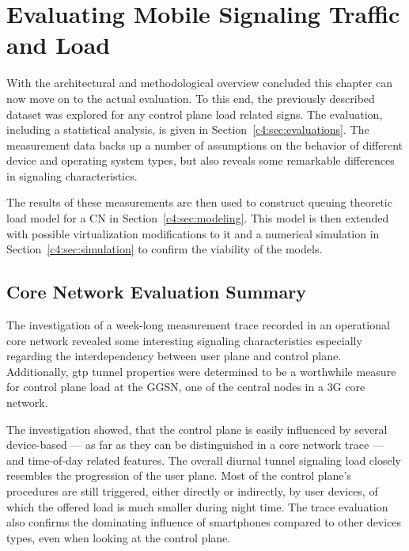 \chapter{Evaluating Mobile Signaling Traffic and Load}
\label{chap:mobilenetsmeasuring}

With the architectural and methodological overview concluded this chapter can now move on to the actual evaluation. To this end, the previously described dataset was explored for any control plane load related signs. The evaluation, including a statistical analysis, is given in Section~\ref{c4:sec:evaluations}. The measurement data backs up a number of assumptions on the behavior of different device and operating system types, but also reveals some remarkable differences in signaling characteristics.

The results of these measurements are then used to construct queuing theoretic load model for a \gls{CN} in Section~\ref{c4:sec:modeling}. This model is then extended with possible virtualization modifications to it and a numerical simulation in Section~\ref{c4:sec:simulation} to confirm the viability of the models.











\section{Core Network Evaluation Summary}
\label{c4:sec:conclusion}


The investigation of a week-long measurement trace recorded in an operational core network revealed some interesting signaling characteristics especially regarding the interdependency between user plane and control plane. Additionally, \gls{gtp} tunnel properties were determined to be a worthwhile measure for control plane load at the \gls{GGSN}, one of the central nodes in a \gls{3G} core network.

The investigation showed, that the control plane is easily influenced by several device-based --- as far as they can be distinguished in a core network trace --- and time-of-day related features. The overall diurnal tunnel signaling load closely resembles the progression of the user plane. Most of the control plane's procedures are still triggered, either directly or indirectly, by user devices, of which the offered load is much smaller during night time. The trace evaluation also confirms the dominating influence of smartphones compared to other devices types, even when looking at the control plane.

